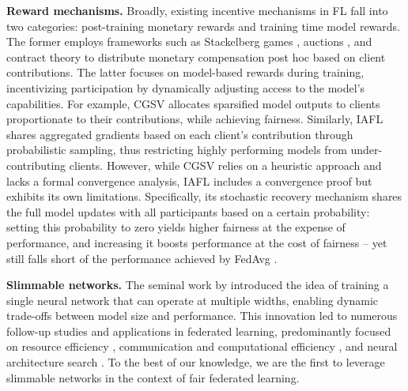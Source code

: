\textbf{Reward mechanisms.} Broadly, existing incentive mechanisms in FL fall into two categories: post-training monetary rewards and training time model rewards. The former employs frameworks such as Stackelberg games \cite{zhan2020learning}, auctions \cite{zhang2021incentive, cong2020game}, and contract theory \cite{liu2022contract, yang2024asynchronous} to distribute monetary compensation post hoc based on client contributions. The latter focuses on model-based rewards during training, incentivizing participation by dynamically adjusting access to the model’s capabilities. For example, CGSV \cite{xu2021gradient} allocates sparsified model outputs to clients proportionate to their contributions, while achieving fairness. Similarly, IAFL \cite{wu2024incentive} shares aggregated gradients based on each client's contribution through probabilistic sampling, thus restricting highly performing models from under-contributing clients. However, while CGSV relies on a heuristic approach and lacks a formal convergence analysis, IAFL includes a convergence proof but exhibits its own limitations. Specifically, its stochastic recovery mechanism shares the full model updates with all participants based on a certain probability: setting this probability to zero yields higher fairness at the expense of performance, and increasing it boosts performance at the cost of fairness -- yet still falls short of the performance achieved by FedAvg \cite{mcmahan2017communication}. 

\textbf{Slimmable networks.} The seminal work by \cite{yu2019slimmable} introduced the idea of training a single neural network that can operate at multiple widths, enabling dynamic trade-offs between model size and performance. This innovation led to numerous follow-up studies and applications in federated learning, predominantly focused on resource efficiency \cite{mei2022resource, horvath2021fjord}, communication and computational efficiency \cite{wang2022progfed}, and neural architecture search \cite{yu2019autoslim}. To the best of our knowledge, we are the first to leverage slimmable networks in the context of fair federated learning.